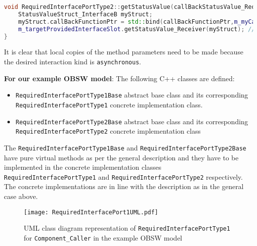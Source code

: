 \begin{Listing}
\begin{lstlisting}[language=C++]
void RequiredInterfacePortType2::getStatusValue(callBackStatusValue_RequiredInterfacePortType2 callBackFunctionPtr) {
	StatusValueStruct_InterfaceB myStruct; 
	myStruct.callBackFunctionPtr = std::bind(callBackFunctionPtr,m_myCallerInstance,std::placeholder::_1);
	m_targetProvidedInterfaceSlot.getStatusValue_Receiver(myStruct); //Simple method call
}
\end{lstlisting}
\caption{Code excerpt from the generated code for interface attribute \texttt{StatusValue} access in \texttt{Required\allowbreak InterfacePort\allowbreak Type2}}
\label{Listing: Required interface port2 Impl}
\end{Listing}

It is clear that local copies of the method parameters need to be made because the desired interaction kind is \texttt{asynchronous}.             

\textbf{For our example OBSW model}: The following C++ classes are defined:
\begin{itemize}
\item \texttt{RequiredInterface\allowbreak PortType1Base} abstract base class and its corresponding \texttt{Required\allowbreak InterfacePort\allowbreak Type1} concrete implementation class.
\item \texttt{RequiredInterface\allowbreak PortType2Base} abstract base class and its corresponding \texttt{Required\allowbreak InterfacePort\allowbreak Type2} concrete implementation class
\end{itemize}

The \texttt{RequiredInterface\allowbreak PortType1Base} and \texttt{RequiredInterface\allowbreak PortType2Base} have pure virtual methods as per the general description and they have to be implemented in the concrete implementation classes \texttt{Required\allowbreak InterfacePort\allowbreak Type1} and \texttt{Required\allowbreak InterfacePort\allowbreak Type2} respectively. The concrete implementations are in line with the description as in the general case above.

\begin{figure}[h]
	\centering
	\texttt{[image: RequiredInterfacePort1UML.pdf]}
	\caption{UML class diagram representation of \texttt{Required\allowbreak InterfacePort\allowbreak Type1} for \texttt{Component\allowbreak\_Caller} in the example OBSW model}
	\label{fig: Required interface port1 UML}
\end{figure}

